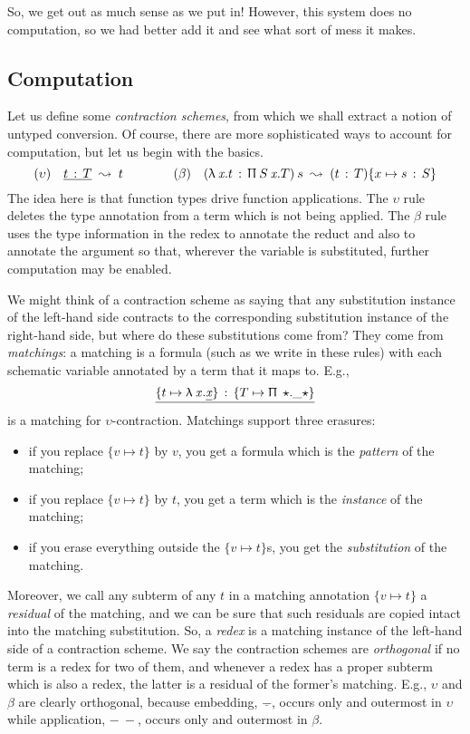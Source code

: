 \documentclass[format=acmsmall, screen, review, anonymous, timestamp]{acmart}
\newcommand{\V}[1]{\purple{\mathit{#1}}}
\newcommand{\ra}[2]{#1 \,:\, #2}
\newcommand{\Ne}{\underline}
\newcommand{\x}[1]{\V{x_{\mathrm{#1}}}}
\newcommand{\Ty}{\blue{\star}}
\begin{document}
So, we get out as much sense as we put in! However, this system does no computation, so we had better add it and see what sort of mess it makes.

  
\subsection{Computation}

\newcommand{\ma}[2]{\{#1\mapsto #2\}}

Let us define some \emph{contraction schemes}, from which we shall extract a notion of untyped conversion. Of course, there are more sophisticated ways to account for computation, but let us begin with the basics.
\[
  (\upsilon)\quad \Ne{\ra tT} \;\leadsto\; t
  \quad\quad\quad\quad 
  (\beta)\quad(\ra{\LF {\x{}}t}{\PT {S}{\x{}}T})\:s \;\leadsto\; (\ra tT)\{x\mapsto\ra sS\}
\]
The idea here is that function types drive function applications. The $\upsilon$ rule deletes the type annotation from a term which is not being applied. The $\beta$ rule uses the type information in the redex to annotate the reduct and also to annotate the argument so that, wherever the variable is substituted, further computation may be enabled.

We might think of a contraction scheme as saying that any substitution instance of the left-hand side contracts to the corresponding substitution instance of the right-hand side, but where do these substitutions come from? They come from \emph{matchings}: a matching is a formula (such as we write in these rules) with each schematic variable annotated by a term that it maps to. E.g.,
\[
  \Ne{\ra{\ma t{\LF x{\Ne{\x{}}}}}{\ma T{\PT\Ty\_\Ty}}}
\]
is a matching for $\upsilon$-contraction. Matchings support three erasures:
\begin{itemize}
\item if you replace $\ma vt$ by $v$, you get a formula which is the \emph{pattern} of the matching;
\item if you replace $\ma vt$ by $t$, you get a term which is the \emph{instance} of the matching;
\item if you erase everything outside the $\ma vt$s, you get the \emph{substitution} of the matching.
\end{itemize}
Moreover, we call any subterm of any $t$ in a matching annotation $\ma vt$ a \emph{residual} of the matching, and we can be sure that such residuals are copied intact into the matching substitution.
So, a \emph{redex} is a matching instance of the left-hand side of a contraction scheme.
We say the contraction schemes are \emph{orthogonal} if no term is a redex for two of them, and whenever a redex has a proper subterm which is also a redex, the latter is a residual of the former's matching. E.g., $\upsilon$ and $\beta$ are clearly orthogonal, because embedding, $\Ne{-}$, occurs only and outermost in $\upsilon$ while application, $-\:-$, occurs only and outermost in $\beta$.
\end{document}
